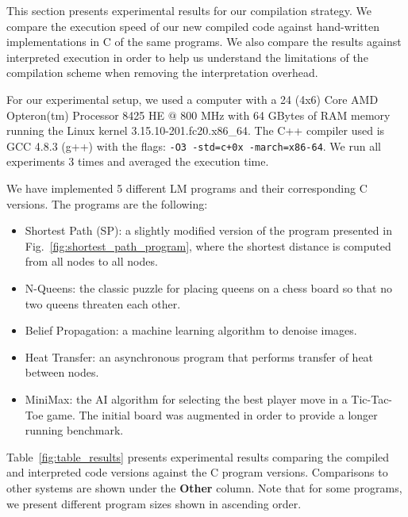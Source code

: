 This section presents experimental results for our compilation strategy.  We
compare the execution speed of our new compiled code against hand-written
implementations in C of the same programs. We also compare the results against
interpreted execution in order to help us understand the limitations of the
compilation scheme when removing the interpretation overhead.

For our experimental setup, we used a computer with a 24 (4x6) Core AMD
Opteron(tm) Processor 8425 HE $@$ 800 MHz with 64 GBytes of RAM memory running
the Linux kernel 3.15.10-201.fc20.x86\_64. The C++ compiler used is GCC 4.8.3
(g++) with the flags: \texttt{-O3 -std=c+0x -march=x86-64}.  We run all
experiments 3 times and averaged the execution time.

We have implemented 5 different LM programs and their corresponding
C versions. The programs are the following:

\begin{itemize}

\item Shortest Path (SP): a slightly modified version of the program presented
   in Fig.~\ref{fig:shortest_path_program}, where the shortest distance is
   computed from all nodes to all nodes.

\item N-Queens: the classic puzzle for placing queens on a chess board so that
no two queens threaten each other.

\item Belief Propagation: a machine learning algorithm to denoise images.

\item Heat Transfer: an asynchronous program that performs transfer of heat
between nodes.

\item MiniMax: the AI algorithm for selecting the best player move in
   a Tic-Tac-Toe game. The initial board was augmented in order to provide a
   longer running benchmark.

\end{itemize}

Table~\ref{fig:table_results} presents experimental results comparing the
compiled and interpreted code versions against the C program versions.
Comparisons to other systems are shown under the \textbf{Other} column. Note
that for some programs, we present different program sizes shown in ascending
order.

